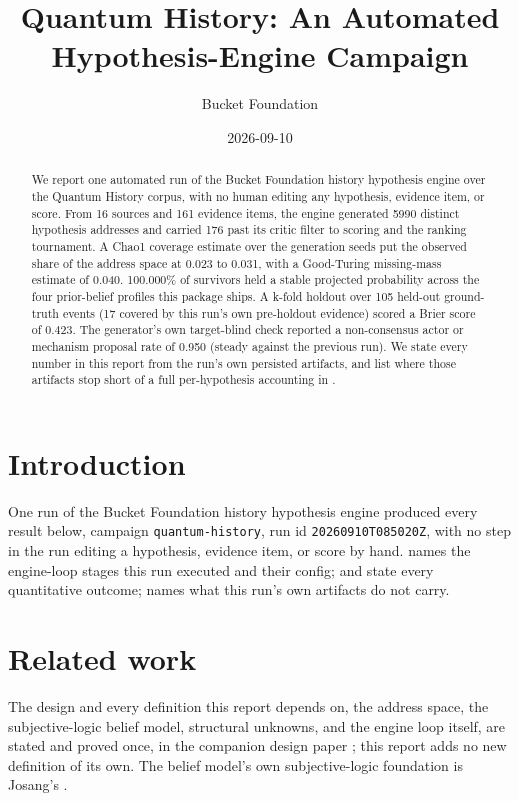 \documentclass[11pt]{article}
\title{Quantum History: An Automated Hypothesis-Engine Campaign}
\author{Bucket Foundation}
\date{2026-09-10}
\begin{document}
\maketitle

\begin{abstract}
We report one automated run of the Bucket Foundation history hypothesis engine \autocite{bkthte2026design} over the Quantum History corpus, with no human editing any hypothesis, evidence item, or score. From 16 sources and 161 evidence items, the engine generated 5990 distinct hypothesis addresses and carried 176 past its critic filter to scoring and the ranking tournament. A Chao1 coverage estimate over the generation seeds put the observed share of the address space at 0.023 to 0.031, with a Good-Turing missing-mass estimate of 0.040. 100.000\% of survivors held a stable projected probability across the four prior-belief profiles this package ships. A k-fold holdout over 105 held-out ground-truth events (17 covered by this run's own pre-holdout evidence) scored a Brier score of 0.423. The generator's own target-blind check reported a non-consensus actor or mechanism proposal rate of 0.950 (steady against the previous run). We state every number in this report from the run's own persisted artifacts, and list where those artifacts stop short of a full per-hypothesis accounting in .
\end{abstract}

\section{Introduction}
\label{sec:intro}

One run of the Bucket Foundation history hypothesis engine produced
every result below, campaign \texttt{quantum-history}, run id
\texttt{20260910T085020Z}, with no step in the run editing a hypothesis,
evidence item, or score by hand.  names the
engine-loop stages this run executed and their config; 
and  state every quantitative outcome;
 names what this run's own artifacts do not
carry.

\section{Related work}
\label{sec:related}

The design and every definition this report depends on, the address
space, the subjective-logic belief model, structural unknowns, and the
engine loop itself, are stated and proved once, in the companion
design paper \autocite{bkthte2026design}; this report adds no new
definition of its own. The belief model's own subjective-logic
foundation is Josang's \autocite{josang2016subjective}.
\end{document}
